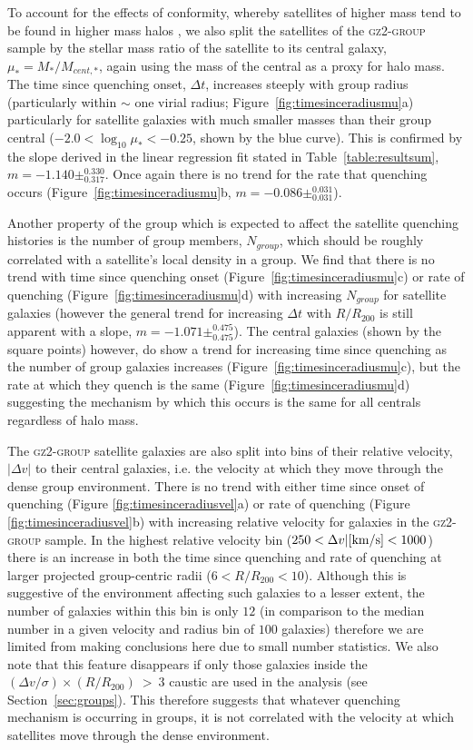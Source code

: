 \documentclass[useAMS,usenatbib]{mn2e}
\begin{document}
To account for the effects of conformity, whereby satellites of higher mass tend to be found in higher mass halos \citep{weinmann06, kauffmann13, hearin15, hatfield16}, we also split the satellites of the \textsc{gz2-group} sample by the stellar mass ratio of the satellite to its central galaxy, $\mu_* = M_*/M_{cent,*}$, again using the mass of the central as a proxy for halo mass. The time since quenching onset, $\Delta t $, increases steeply with group radius (particularly within $\sim$ one virial radius; Figure~\ref{fig:timesinceradiusmu}a) particularly for satellite galaxies with much smaller masses than their group central ($-2.0 < \log_{10}\mu_* < -0.25$, shown by the blue curve). This is confirmed by the slope derived in the linear regression fit stated in Table~\ref{table:resultsum}, $m=-1.140\pm_{0.317}^{0.330}$. Once again there is no trend for the rate that quenching occurs (Figure~\ref{fig:timesinceradiusmu}b, $m=-0.086\pm_{0.031}^{0.031}$). 

Another property of the group which is expected to affect the satellite quenching histories is the number of group members, $N_{group}$, which should be roughly correlated with a satellite's local density in a  group. We find that there is no trend with time since quenching onset (Figure~\ref{fig:timesinceradiusmu}c) or rate of quenching (Figure~\ref{fig:timesinceradiusmu}d) with increasing $N_{group}$ for satellite galaxies (however the general trend for increasing $\Delta t$ with $R/R_{200}$ is still apparent with a slope, $m=-1.071\pm_{0.475}^{0.475}$). The central galaxies (shown by the square points) however, do show a trend for increasing time since quenching as the number of group galaxies increases (Figure~\ref{fig:timesinceradiusmu}c), but the rate at which they quench is the same (Figure~\ref{fig:timesinceradiusmu}d) suggesting the mechanism by which this occurs is the same for all centrals regardless of halo mass. 

The \textsc{gz2-group} satellite galaxies are also split into bins of their relative velocity, $|\Delta v|$ to their central galaxies, i.e. the velocity at which they move through the dense group environment. There is no trend with either time since onset of quenching (Figure \ref{fig:timesinceradiusvel}a) or rate of quenching (Figure \ref{fig:timesinceradiusvel}b) with increasing relative velocity for galaxies in the \textsc{gz2-group} sample. In the highest relative velocity bin ($250 < \Delta v| [\rm{km/s}] < 1000$) there is an increase in both the time since quenching and rate of quenching at larger projected group-centric radii ($6 < R/R_{200} < 10$). Although this is suggestive of the environment affecting such galaxies to a lesser extent, the number of galaxies within this bin is only $12$ (in comparison to the median number in a given velocity and radius bin of $100$ galaxies) therefore we are limited from making conclusions here due to small number statistics. We also note that this feature disappears if only those galaxies inside the $(\Delta v/\sigma)\times(R/R_{200})~>~3$ caustic are used in the analysis (see Section~\ref{sec:groups}). This therefore suggests that whatever quenching mechanism is occurring in groups, it is not correlated with the velocity at which satellites move through the dense environment.
\end{document}
